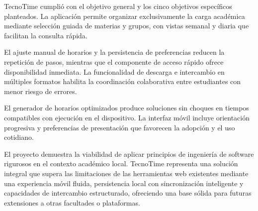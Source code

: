 \noindent TecnoTime cumplió con el objetivo general y los cinco objetivos específicos planteados. La aplicación permite organizar exclusivamente la carga académica mediante selección guiada de materias y grupos, con vistas semanal y diaria que facilitan la consulta rápida.

\noindent El ajuste manual de horarios y la persistencia de preferencias reducen la repetición de pasos, mientras que el componente de acceso rápido ofrece disponibilidad inmediata. La funcionalidad de descarga e intercambio en múltiples formatos habilita la coordinación colaborativa entre estudiantes con menor riesgo de errores.

\noindent El generador de horarios optimizados produce soluciones sin choques en tiempos compatibles con ejecución en el dispositivo. La interfaz móvil incluye orientación progresiva y preferencias de presentación que favorecen la adopción y el uso cotidiano.

\noindent El proyecto demuestra la viabilidad de aplicar principios de ingeniería de software rigurosos en el contexto académico local. TecnoTime representa una solución integral que supera las limitaciones de las herramientas web existentes mediante una experiencia móvil fluida, persistencia local con sincronización inteligente y capacidades de intercambio estructurado, ofreciendo una base sólida para futuras extensiones a otras facultades o plataformas.

